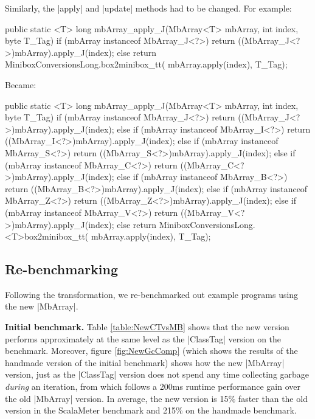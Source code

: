 Similarly, the |apply| and |update| methods had to be changed.
For example:

\begin{lstlisting-nobreak-java}
public static <T> long mbArray_apply_J(MbArray<T> mbArray, int index, byte T_Tag) {
  if (mbArray instanceof MbArray_J<?>)
    return ((MbArray_J<?>)mbArray).apply_J(index);
  else
    return MiniboxConversionsLong.box2minibox_tt(
    	mbArray.apply(index), T_Tag);
}
\end{lstlisting-nobreak-java}

Became:

\begin{lstlisting-nobreak-java}
public static <T> long mbArray_apply_J(MbArray<T> mbArray, int index, byte T_Tag) {
  if (mbArray instanceof MbArray_J<?>)
    return ((MbArray_J<?>)mbArray).apply_J(index);
  else if (mbArray instanceof MbArray_I<?>)
    return ((MbArray_I<?>)mbArray).apply_J(index);
  else if (mbArray instanceof MbArray_S<?>)
    return ((MbArray_S<?>)mbArray).apply_J(index);
  else if (mbArray instanceof MbArray_C<?>)
    return ((MbArray_C<?>)mbArray).apply_J(index);
  else if (mbArray instanceof MbArray_B<?>)
    return ((MbArray_B<?>)mbArray).apply_J(index);
  else if (mbArray instanceof MbArray_Z<?>)
    return ((MbArray_Z<?>)mbArray).apply_J(index);
  else if (mbArray instanceof MbArray_V<?>)
    return ((MbArray_V<?>)mbArray).apply_J(index);
  else
    return MiniboxConversionsLong.<T>box2minibox_tt(
    	mbArray.apply(index), T_Tag);
}
\end{lstlisting-nobreak-java}

\subsection{Re-benchmarking}

Following the transformation, we re-benchmarked out example programs using the new |MbArray|.
 
\textbf{Initial benchmark.} Table \ref{table:NewCTvsMB} shows that the new version performs approximately at the same level as the |ClassTag| version on the benchmark. Moreover, figure \ref{fig:NewGcComp} (which shows the results of the handmade version of the initial benchmark) shows how the new |MbArray| version, just as the |ClassTag| version does not spend any time collecting garbage \emph{during} an iteration, from which follows a 200ms runtime performance gain over the old |MbArray| version. In average, the new version is 15\% faster than the old version in the ScalaMeter benchmark and 215\% on the handmade benchmark.


